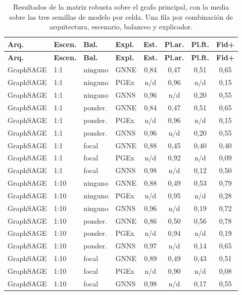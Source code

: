 \begin{longtable}{llll cccc}
\caption{Resultados de la matriz robusta sobre el grafo principal, con la media sobre las tres semillas de modelo por celda. Una fila por combinación de arquitectura, escenario, balanceo y explicador.}\label{tab:synth-robust-full}\\
\toprule
\textbf{Arq.} & \textbf{Escen.} & \textbf{Bal.} & \textbf{Expl.} & \textbf{Est.} & \textbf{Pl.ar.} & \textbf{Pl.ft.} & \textbf{Fid+} \\
\midrule
\endfirsthead
\toprule
\textbf{Arq.} & \textbf{Escen.} & \textbf{Bal.} & \textbf{Expl.} & \textbf{Est.} & \textbf{Pl.ar.} & \textbf{Pl.ft.} & \textbf{Fid+} \\
\midrule
\endhead
\bottomrule
\endfoot
GraphSAGE & 1:1 & ninguno & GNNE & 0,84 & 0,47 & 0,51 & 0,65 \\
GraphSAGE & 1:1 & ninguno & PGEx & n/d & 0,96 & n/d & 0,15 \\
GraphSAGE & 1:1 & ninguno & GNNS & 0,96 & n/d & 0,20 & 0,55 \\
GraphSAGE & 1:1 & ponder. & GNNE & 0,84 & 0,47 & 0,51 & 0,65 \\
GraphSAGE & 1:1 & ponder. & PGEx & n/d & 0,96 & n/d & 0,15 \\
GraphSAGE & 1:1 & ponder. & GNNS & 0,96 & n/d & 0,20 & 0,55 \\
GraphSAGE & 1:1 & focal & GNNE & 0,88 & 0,45 & 0,40 & 0,40 \\
GraphSAGE & 1:1 & focal & PGEx & n/d & 0,92 & n/d & 0,09 \\
GraphSAGE & 1:1 & focal & GNNS & 0,98 & n/d & 0,12 & 0,50 \\
GraphSAGE & 1:10 & ninguno & GNNE & 0,88 & 0,49 & 0,53 & 0,79 \\
GraphSAGE & 1:10 & ninguno & PGEx & n/d & 0,95 & n/d & 0,28 \\
GraphSAGE & 1:10 & ninguno & GNNS & 0,96 & n/d & 0,19 & 0,72 \\
GraphSAGE & 1:10 & ponder. & GNNE & 0,86 & 0,50 & 0,56 & 0,78 \\
GraphSAGE & 1:10 & ponder. & PGEx & n/d & 0,94 & n/d & 0,19 \\
GraphSAGE & 1:10 & ponder. & GNNS & 0,97 & n/d & 0,14 & 0,65 \\
GraphSAGE & 1:10 & focal & GNNE & 0,89 & 0,49 & 0,43 & 0,51 \\
GraphSAGE & 1:10 & focal & PGEx & n/d & 0,90 & n/d & 0,08 \\
GraphSAGE & 1:10 & focal & GNNS & 0,98 & n/d & 0,17 & 0,55 \\

\end{longtable}
